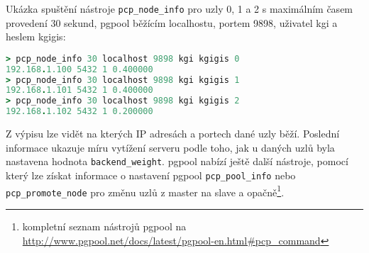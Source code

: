 Ukázka spuštění nástroje \texttt{pcp\_node\_info} pro uzly 0, 1 a 2 s maximálním časem provedení 30 sekund, pgpool běžícím localhostu, portem 9898, uživatel kgi a heslem kgigis:
\begin{lstlisting}[language=ruby,morekeywords={pcp_node_info}]
> pcp_node_info 30 localhost 9898 kgi kgigis 0
192.168.1.100 5432 1 0.400000
> pcp_node_info 30 localhost 9898 kgi kgigis 1
192.168.1.101 5432 1 0.400000
> pcp_node_info 30 localhost 9898 kgi kgigis 2
192.168.1.102 5432 1 0.200000
\end{lstlisting}

Z výpisu lze vidět na kterých IP adresách a portech dané uzly běží. Poslední informace ukazuje míru vytížení serveru podle toho, jak u daných uzlů byla nastavena hodnota \texttt{backend\_weight}. pgpool nabízí ještě další nástroje, pomocí který lze získat informace o nastavení pgpool \texttt{pcp\_pool\_info} nebo \texttt{pcp\_promote\_node} pro změnu uzlů z master na slave a opačně\footnote{kompletní seznam nástrojů pgpool na \url{http://www.pgpool.net/docs/latest/pgpool-en.html\#pcp\_command}}.

